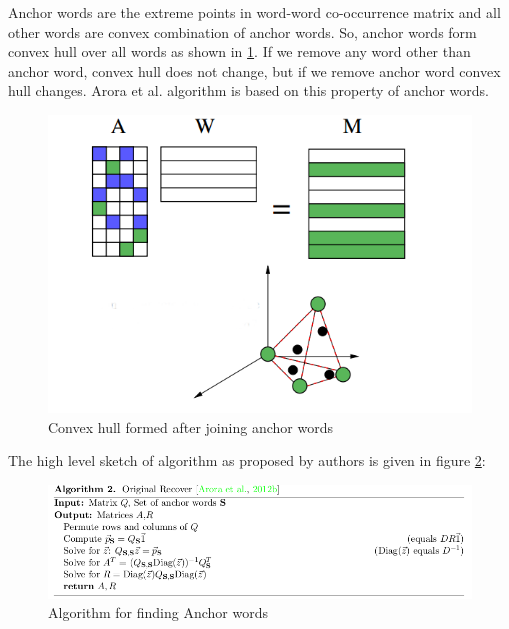 \documentclass[a4paper,11pt]{article}
\begin{document}
Anchor words are the extreme points in word-word co-occurrence matrix and all other words are convex combination of anchor words. So, anchor words form convex hull over all words as shown in \ref{fig:convexhull}. If we remove any word other than anchor word, convex hull does not change, but if we remove anchor word convex hull changes. Arora et al. \cite{tm} algorithm is based on this property of anchor words. \\



\begin{figure}[htb]
\centering
\includegraphics[scale=0.4]{convexhull.png}
\caption{Convex hull formed after joining anchor words \cite{tm}}
\label{fig:convexhull}
\end{figure}
The high level sketch of algorithm as proposed by authors \cite{tm} is given in figure \ref{fig:algorithm}:

\begin{figure}[htb]
\includegraphics[scale=0.5]{algorithm.png}
\caption{Algorithm for finding Anchor words }
\label{fig:algorithm}
\end{figure}
\end{document}
